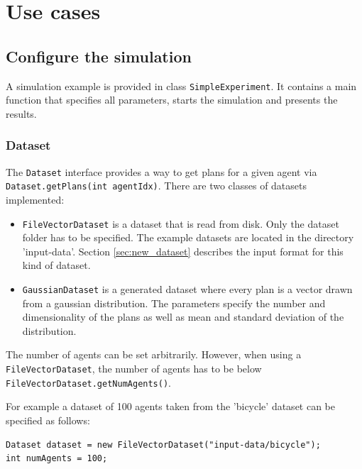 \documentclass[11pt]{article} %
\newcommand{\code}{\texttt}
\begin{document}
\section{Use cases}
\subsection{Configure the simulation}
A simulation example is provided in class \code{SimpleExperiment}. It contains a main function that specifies all parameters, starts the simulation and presents the results.

\subsubsection*{Dataset}
The \code{Dataset} interface provides a way to get plans for a given agent via \code{Dataset.getPlans(int agentIdx)}.
There are two classes of datasets implemented:
\begin{itemize}
	\item \code{FileVectorDataset} is a dataset that is read from disk. Only the dataset folder has to be specified. The example datasets are located in the directory 'input-data'. Section \ref{sec:new_dataset} describes the input format for this kind of dataset.
	\item \code{GaussianDataset} is a generated dataset where every plan is a vector drawn from a gaussian distribution. The parameters specify the number and dimensionality of the plans as well as mean and standard deviation of the distribution.
\end{itemize}
The number of agents can be set arbitrarily. However, when using a \code{FileVectorDataset}, the number of agents has to be below \code{FileVectorDataset.getNumAgents()}.

For example a dataset of 100 agents taken from the 'bicycle' dataset can be specified as follows:
\begin{verbatim}
Dataset dataset = new FileVectorDataset("input-data/bicycle");
int numAgents = 100;
\end{verbatim}
\end{document}
